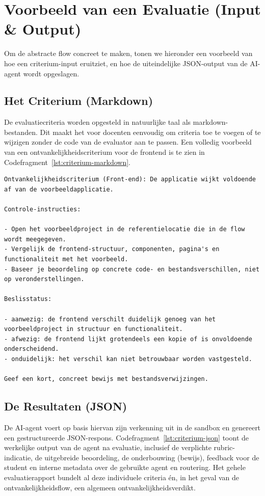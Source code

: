 \vspace{1em}

\section{Voorbeeld van een Evaluatie (Input \& Output)}

Om de abstracte flow concreet te maken, tonen we hieronder een voorbeeld van hoe een criterium-input eruitziet, en hoe de uiteindelijke JSON-output van de AI-agent wordt opgeslagen.

\vspace{1em}

\subsection{Het Criterium (Markdown)}
De evaluatiecriteria worden opgesteld in natuurlijke taal als markdown-bestanden. Dit maakt het voor docenten eenvoudig om criteria toe te voegen of te wijzigen zonder de code van de evaluator aan te passen. Een volledig voorbeeld van een ontvankelijkheidscriterium voor de frontend is te zien in Codefragment~\ref{lst:criterium-markdown}.

\begin{listing}[htbp]
\begin{verbatim}
Ontvankelijkheidscriterium (Front-end): De applicatie wijkt voldoende af van de voorbeeldapplicatie.

Controle-instructies:

- Open het voorbeeldproject in de referentielocatie die in de flow wordt meegegeven.
- Vergelijk de frontend-structuur, componenten, pagina's en functionaliteit met het voorbeeld.
- Baseer je beoordeling op concrete code- en bestandsverschillen, niet op veronderstellingen.

Beslisstatus:

- aanwezig: de frontend verschilt duidelijk genoeg van het voorbeeldproject in structuur en functionaliteit.
- afwezig: de frontend lijkt grotendeels een kopie of is onvoldoende onderscheidend.
- onduidelijk: het verschil kan niet betrouwbaar worden vastgesteld.

Geef een kort, concreet bewijs met bestandsverwijzingen.
\end{verbatim}
\caption{Voorbeeld van een ontvankelijkheidscriterium in markdown-formaat.}
\label{lst:criterium-markdown}
\end{listing}

\subsection{De Resultaten (JSON)}
De AI-agent voert op basis hiervan zijn verkenning uit in de sandbox en genereert een gestructureerde JSON-respons. Codefragment~\ref{lst:criterium-json} toont de werkelijke output van de agent na evaluatie, inclusief de verplichte rubric-indicatie, de uitgebreide beoordeling, de onderbouwing (bewijs), feedback voor de student en interne metadata over de gebruikte agent en routering. Het gehele evaluatierapport bundelt al deze individuele criteria én, in het geval van de ontvankelijkheidsflow, een algemeen ontvankelijkheidsverdikt.


